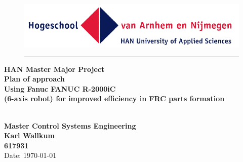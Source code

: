 \begin{titlepage}
	\begin{flushright}
	\begin{minipage}{\linewidth}
		\begin{figure}[H]
			\begin{flushright}
			\includegraphics[width=0.5\linewidth]{Images/HAN}
		\end{flushright}
		\hrule
		\end{figure}
		\begin{flushright}
			\large\textbf{ HAN Master Major Project}\\
			\vspace{20pt}
			\Huge\textbf{Plan of approach
			\\
			\vspace{10pt}
			Using Fanuc FANUC R-2000iC\\
			(6-axis robot) for improved efficiency in FRC parts formation }
		\end{flushright}
		\vspace{140pt}
		\begin{figure}[H]
		\begin{flushleft}
		\end{flushleft}	
		\end{figure}
		\begin{flushright}
			\LARGE \textbf
			{
			\\Master Control Systems Engineering
			\\Karl Wallkum 
			\\617931
			}
			\\Date: \today
		 		
		\end{flushright}
	\end{minipage}
	\end{flushright}

\end{titlepage}